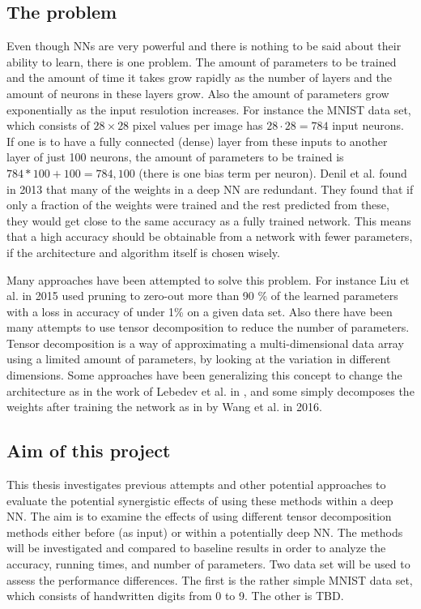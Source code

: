 \subsection{The problem}
Even though NNs are very powerful and there is nothing to be said about their ability to learn, there is one problem. The amount of parameters to be trained and the amount of time it takes grow rapidly as the number of layers and the amount of neurons in these layers grow. Also the amount of parameters grow exponentially as the input resulotion increases. For instance the MNIST data set, which consists of $28\times28$ pixel values per image has $28\cdot28 = 784$ input neurons. If one is to have a fully connected (dense) layer from these inputs to another layer of just 100 neurons, the amount of parameters to be trained is $784 * 100 + 100 = 784,100$ (there is one bias term per neuron). Denil et al. found in 2013 that many of the weights in a deep NN are redundant\cite{Denil2013}. They found that if only a fraction of the weights were trained and the rest predicted from these, they would get close to the same accuracy as a fully trained network. This means that a high accuracy should be obtainable from a network with fewer parameters, if the architecture and algorithm itself is chosen wisely.

Many approaches have been attempted to solve this problem. For instance Liu et al. in 2015 used pruning to zero-out more than 90 \% of the learned parameters with a loss in accuracy of under 1\% on a given data set. Also there have been many attempts to use tensor decomposition to reduce the number of parameters. Tensor decomposition is a way of approximating a multi-dimensional data array using a limited amount of parameters, by looking at the variation in different dimensions. Some approaches have been generalizing this concept to change the architecture as in the work of Lebedev et al. in \cite{Lebedev2015}, and some simply decomposes the weights after training the network as in \cite{Wang2016} by Wang et al. in 2016. 

\subsection{Aim of this project}
This thesis investigates previous attempts and other potential approaches to evaluate the potential synergistic effects of using these methods within a deep NN. The aim is to examine the effects of using different tensor decomposition methods either before (as input) or within a potentially deep NN. The methods will be investigated and compared to baseline results in order to analyze the accuracy, running times, and number of parameters. Two data set will be used to assess the performance differences. The first is the rather simple MNIST\cite{MNIST} data set, which consists of handwritten digits from 0 to 9. The other is TBD. 